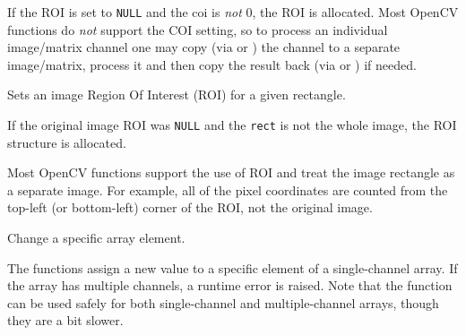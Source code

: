 If the ROI is set to \texttt{NULL} and the coi is \textit{not} 0,
the ROI is allocated. Most OpenCV functions do \textit{not} support
the COI setting, so to process an individual image/matrix channel one
may copy (via  or ) the channel to a separate
image/matrix, process it and then copy the result back (via 
or ) if needed.

Sets an image Region Of Interest (ROI) for a given rectangle.


\begin{description}
\end{description}

If the original image ROI was \texttt{NULL} and the \texttt{rect} is not the whole image, the ROI structure is allocated.

Most OpenCV functions support the use of ROI and treat the image rectangle as a separate image. For example, all of the pixel coordinates are counted from the top-left (or bottom-left) corner of the ROI, not the original image.

\ifC %
Change a specific array element.


\begin{description}
\end{description}

The functions assign a new value to a specific
element of a single-channel array. If the array has multiple channels,
a runtime error is raised. Note that the  function can be used
safely for both single-channel and multiple-channel arrays, though they
are a bit slower.

